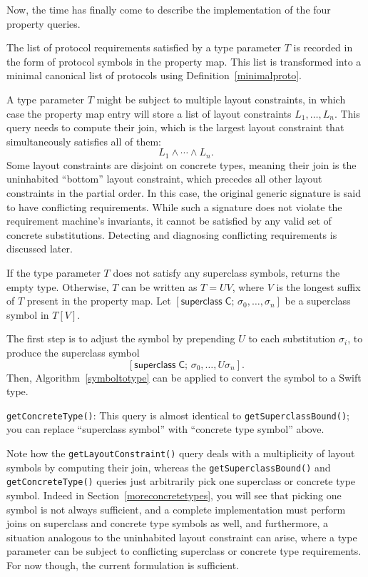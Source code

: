 \documentclass[a4paper,headsepline,bibliography=totoc,toc=flat,fleqn,twoside=semi]{scrbook}
\theoremstyle{definition}
\theoremstyle{definition}
\theoremstyle{definition}
\newcommand{\namesym}[1]{\mathsf{#1}}
\newcommand{\supersym}[1]{[\mathsf{superclass}\;#1]}
\begin{document}
Now, the time has finally come to describe the implementation of the four property queries.
\begin{description}
\item[\texttt{getRequiredProtocols()}] The list of protocol requirements satisfied by a type parameter $T$ is recorded in the form of protocol symbols in the property map. This list is transformed into a minimal canonical list of protocols using Definition~\ref{minimalproto}.
\item[\texttt{getLayoutConstraint()}] A type parameter $T$ might be subject to multiple layout constraints, in which case the property map entry will store a list of layout constraints $L_1,\ldots,L_n$. This query needs to compute their join, which is the largest layout constraint that simultaneously satisfies all of them:
\[L_1\wedge\cdots\wedge L_n.\]
Some layout constraints are disjoint on concrete types, meaning their join is the uninhabited ``bottom'' layout constraint, which precedes all other layout constraints in the partial order. In this case, the original generic signature is said to have conflicting requirements. While such a signature does not violate the requirement machine's invariants, it cannot be satisfied by any valid set of concrete substitutions. Detecting and diagnosing conflicting requirements is discussed later.

\item[\texttt{getSuperclassBound()}] If the type parameter $T$ does not satisfy any superclass symbols, returns the empty type.
Otherwise, $T$ can be written as $T=UV$, where $V$ is the longest suffix of $T$ present in the property map. Let $\supersym{\namesym{C};\,\sigma_0,\ldots,\sigma_n}$ be a superclass symbol in $T[V]$.

The first step is to adjust the symbol by prepending $U$ to each substitution $\sigma_i$, to produce the superclass symbol
\[\supersym{\namesym{C};\,\sigma_0,\ldots,U\sigma_n}.\]
Then, Algorithm~\ref{symboltotype} can be applied to convert the symbol to a Swift type.
\item\texttt{getConcreteType()}: This query is almost identical to \texttt{getSuperclassBound()}; you can replace ``superclass symbol'' with ``concrete type symbol'' above.
\end{description}
Note how the \texttt{getLayoutConstraint()} query deals with a multiplicity of layout symbols by computing their join, whereas the \texttt{getSuperclassBound()} and \texttt{getConcreteType()} queries just arbitrarily pick one superclass or concrete type symbol. Indeed in Section~\ref{moreconcretetypes}, you will see that picking one symbol is not always sufficient, and a complete implementation must perform joins on superclass and concrete type symbols as well, and furthermore, a situation analogous to the uninhabited layout constraint can arise, where a type parameter can be subject to conflicting superclass or concrete type requirements. For now though, the current formulation is sufficient.
\end{document}
